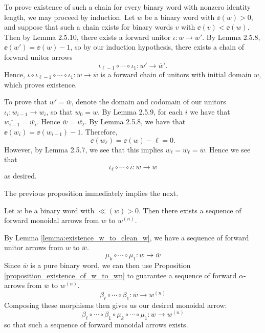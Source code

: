 \begin{prf}
    To prove existence of such a chain for every binary word with nonzero identity 
    length, we may proceed by induction.
    Let $w$ be a binary word with $\ee(w) > 0$, and 
    suppose that such a chain exists for binary words $v$ with 
    $\ee(v) < \ee(w)$. Then by Lemma 2.5.10, there exists a forward unitor 
    $\iota: w \to w'$. By Lemma 2.5.8, $\ee(w') = \ee(w) - 1$, so by our induction 
    hypothesis, there exists a chain of forward unitor arrows 
    \[
        \iota_{{\ell}-1}\circ \cdots \circ \iota_1: w' \to \overline{w}'.
    \]
    Hence, $\iota \circ \iota_{{\ell}-1}\circ \cdots \circ \iota_1: w \to \overline{w}$
    is a forward chain of unitors with initial domain $w$, which proves existence.

    To prove that $w' = \overline{w}$, 
    denote the domain and codomain of our unitors 
    $\iota_i: w_{i-1} \to w_{i}$, so that $w_0 = w$. 
    By Lemma 2.5.9, for each $i$ we have that $\overline{w_{i-1}} = \overline{w_{i}}$. 
    Hence $\overline{w} = \overline{w_{{\ell}}}$. 
    By Lemma 2.5.8, we have that $\ee(w_i) = \ee(w_{i-1}) - 1$. 
    Therefore, 
    \[
        \ee(w_{\ell}) = \ee(w) - {\ell} = 0.  
    \]
    However, by Lemma 2.5.7, we see that this implies $w_{\ell} = \overline{w_{\ell}} = \overline{w}$. 
    Hence we see that 
    \[
        \iota_{\ell} \circ \cdots \circ \iota: w \to \overline{w}
    \]
    as desired.
\end{prf}



The previous proposition immediately implies the next. 

\begin{proposition}\label{proposition:full_existence_w_to_wn}
    Let $w$ be a binary word with $\ll(w) > 0$. Then there exists a sequence 
    of forward monoidal arrows from $w$ to $w^{(n)}$. 
\end{proposition}

\begin{prf}
    By Lemma \ref{lemma:existence_w_to_clean_w}, we have a 
    sequence of forward unitor arrows from $w$ to $\overline{w}$.
    \[
        \mu_k \circ \cdots \circ \mu_1: w \to \overline{w}
    \]
    Since $\overline{w}$ is a 
    pure binary word, we can then use Proposition \ref{proposition_existence_of_w_to_wn}
    to guarantee a sequence of forward $\alpha$-arrows 
    from $\overline{w}$ to $w^{(n)}$. 
    \[
        \beta_{\ell} \circ \cdots \circ \beta_1: \overline{w} \to w^{(n)}  
    \]
    Composing these morphisms then gives us our desired monoidal arrow:
    \[
        \beta_{\ell} \circ \cdots \circ \beta_1 \circ \mu_k \circ \cdots \circ \mu_1:
        w \to w^{(n)}
    \]
    so that such a sequence of forward monoidal arrows exists.
\end{prf}

